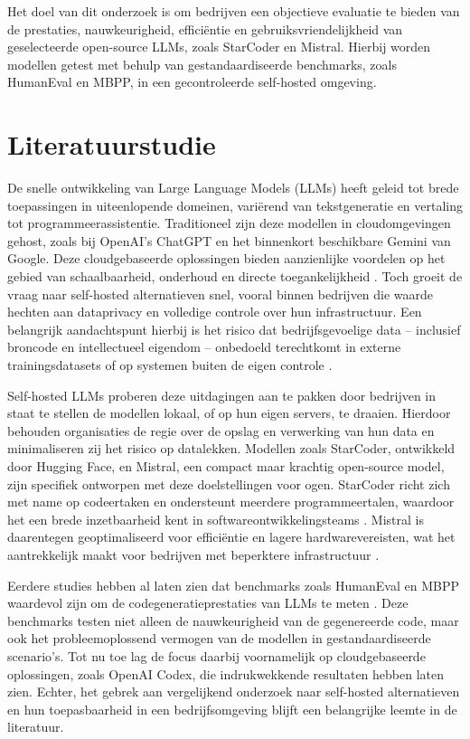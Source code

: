 Het doel van dit onderzoek is om bedrijven een objectieve evaluatie te bieden van de prestaties, nauwkeurigheid, efficiëntie en gebruiksvriendelijkheid van geselecteerde open-source LLMs, zoals StarCoder en Mistral. Hierbij worden modellen getest met behulp van gestandaardiseerde benchmarks, zoals HumanEval en MBPP, in een gecontroleerde self-hosted omgeving.


\section{Literatuurstudie}%
\label{sec:literatuurstudie}

De snelle ontwikkeling van Large Language Models (LLMs) heeft geleid tot brede toepassingen in uiteenlopende domeinen, variërend van tekstgeneratie en vertaling tot programmeerassistentie. Traditioneel zijn deze modellen in cloudomgevingen gehost, zoals bij OpenAI's ChatGPT en het binnenkort beschikbare Gemini van Google. Deze cloudgebaseerde oplossingen bieden aanzienlijke voordelen op het gebied van schaalbaarheid, onderhoud en directe toegankelijkheid \autocite{Brown2020}. Toch groeit de vraag naar self-hosted alternatieven snel, vooral binnen bedrijven die waarde hechten aan dataprivacy en volledige controle over hun infrastructuur. Een belangrijk aandachtspunt hierbij is het risico dat bedrijfsgevoelige data – inclusief broncode en intellectueel eigendom – onbedoeld terechtkomt in externe trainingsdatasets of op systemen buiten de eigen controle \autocite{Rao2023}.

Self-hosted LLMs proberen deze uitdagingen aan te pakken door bedrijven in staat te stellen de modellen lokaal, of op hun eigen servers, te draaien. Hierdoor behouden organisaties de regie over de opslag en verwerking van hun data en minimaliseren zij het risico op datalekken. Modellen zoals StarCoder, ontwikkeld door Hugging Face, en Mistral, een compact maar krachtig open-source model, zijn specifiek ontworpen met deze doelstellingen voor ogen. StarCoder richt zich met name op codeertaken en ondersteunt meerdere programmeertalen, waardoor het een brede inzetbaarheid kent in softwareontwikkelingsteams \autocite{Li2022}. Mistral is daarentegen geoptimaliseerd voor efficiëntie en lagere hardwarevereisten, wat het aantrekkelijk maakt voor bedrijven met beperktere infrastructuur \autocite{Mistral2023}.

Eerdere studies hebben al laten zien dat benchmarks zoals HumanEval en MBPP waardevol zijn om de codegeneratieprestaties van LLMs te meten \autocite{Chen2021}. Deze benchmarks testen niet alleen de nauwkeurigheid van de gegenereerde code, maar ook het probleemoplossend vermogen van de modellen in gestandaardiseerde scenario’s. Tot nu toe lag de focus daarbij voornamelijk op cloudgebaseerde oplossingen, zoals OpenAI Codex, die indrukwekkende resultaten hebben laten zien. Echter, het gebrek aan vergelijkend onderzoek naar self-hosted alternatieven en hun toepasbaarheid in een bedrijfsomgeving blijft een belangrijke leemte in de literatuur.

